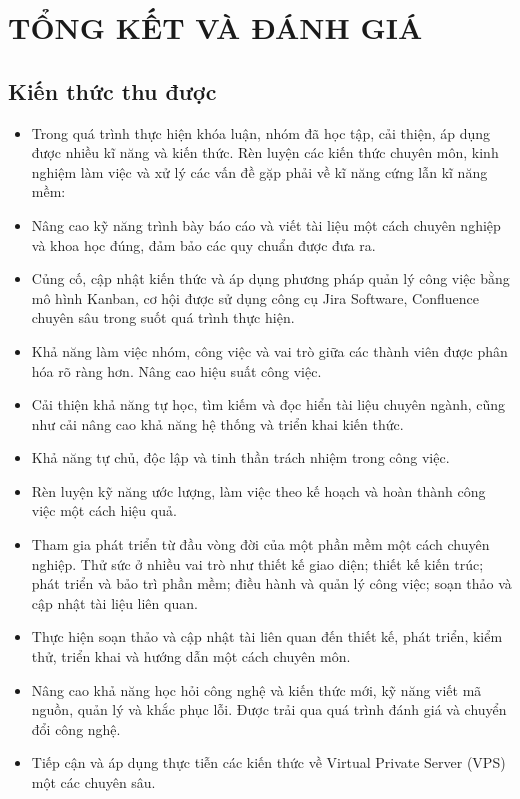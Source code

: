 \chapter{TỔNG KẾT VÀ ĐÁNH GIÁ}

\section{Kiến thức thu được}

\begin{itemize}
    \item Trong quá trình thực hiện khóa luận, nhóm đã học tập, cải thiện, áp dụng được nhiều kĩ năng và kiến thức. Rèn luyện các kiến thức chuyên môn, kinh nghiệm làm việc và xử lý các vấn đề gặp phải về kĩ năng cứng lẫn kĩ năng mềm:
    \item Nâng cao kỹ năng trình bày báo cáo và viết tài liệu một cách chuyên nghiệp và khoa học đúng, đảm bảo các quy chuẩn được đưa ra.
    \item Củng cố, cập nhật kiến thức và áp dụng phương pháp quản lý công việc bằng mô hình Kanban, cơ hội được sử dụng công cụ Jira Software, Confluence chuyên sâu trong suốt quá trình thực hiện.
    \item Khả năng làm việc nhóm, công việc và vai trò giữa các thành viên được phân hóa rõ ràng hơn. Nâng cao hiệu suất công việc.
    \item Cải thiện khả năng tự học, tìm kiếm và đọc hiển tài liệu chuyên ngành, cũng như cải nâng cao khả năng hệ thống và triển khai kiến thức.
    \item Khả năng tự chủ, độc lập và tinh thần trách nhiệm trong công việc.
    \item Rèn luyện kỹ năng ước lượng, làm việc theo kế hoạch và hoàn thành công việc một cách hiệu quả.
    \item Tham gia phát triển từ đầu vòng đời của một phần mềm một cách chuyên nghiệp. Thử sức ở nhiều vai trò như thiết kế giao diện; thiết kế kiến trúc; phát triển và bảo trì phần mềm; điều hành và quản lý công việc; soạn thảo và cập nhật tài liệu liên quan.
    \item Thực hiện soạn thảo và cập nhật tài liên quan đến thiết kế, phát triển, kiểm thử, triển khai và hướng dẫn một cách chuyên môn.
    \item Nâng cao khả năng học hỏi công nghệ và kiến thức mới, kỹ năng viết mã nguồn, quản lý và khắc phục lỗi. Được trải qua quá trình đánh giá và chuyển đổi công nghệ.
    \item Tiếp cận và áp dụng thực tiễn các kiến thức về Virtual Private Server (VPS) một các chuyên sâu.
\end{itemize}

